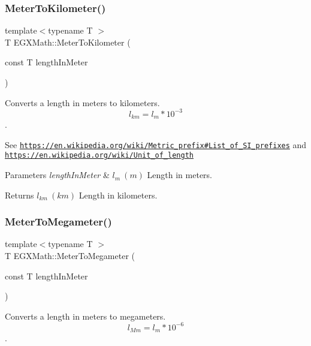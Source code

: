 \subsubsection{\texorpdfstring{Meter\+To\+Kilometer()}{MeterToKilometer()}}
{\footnotesize\ttfamily template$<$typename T $>$ \\
T E\+G\+X\+Math\+::\+Meter\+To\+Kilometer (\begin{DoxyParamCaption}\item[{const T}]{length\+In\+Meter }\end{DoxyParamCaption})}



Converts a length in meters to kilometers. \[ l_{km}=l_{m} * 10^{-3} \]. 

See \href{https://en.wikipedia.org/wiki/Metric_prefix#List_of_SI_prefixes}{\tt https\+://en.\+wikipedia.\+org/wiki/\+Metric\+\_\+prefix\#\+List\+\_\+of\+\_\+\+S\+I\+\_\+prefixes} and \href{https://en.wikipedia.org/wiki/Unit_of_length}{\tt https\+://en.\+wikipedia.\+org/wiki/\+Unit\+\_\+of\+\_\+length} 
\begin{DoxyParams}{Parameters}
{\em length\+In\+Meter} & $ l_{m}\ (m)$ Length in meters. \\
\hline
\end{DoxyParams}
\begin{DoxyReturn}{Returns}
$ l_{km}\ (km)$ Length in kilometers. 
\end{DoxyReturn}
\mbox{\label{group___e_g_x_math-_conversions-_length_conversions-_meter-_s_i_ga738fd2590049b1c2ae6ef2ecad9ed7f9}} 
\subsubsection{\texorpdfstring{Meter\+To\+Megameter()}{MeterToMegameter()}}
{\footnotesize\ttfamily template$<$typename T $>$ \\
T E\+G\+X\+Math\+::\+Meter\+To\+Megameter (\begin{DoxyParamCaption}\item[{const T}]{length\+In\+Meter }\end{DoxyParamCaption})}



Converts a length in meters to megameters. \[ l_{Mm}=l_{m} * 10^{-6} \]. 

